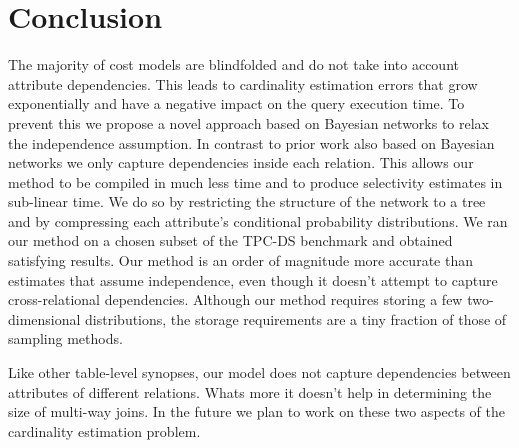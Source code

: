 \documentclass[runningheads]{llncs}
\begin{document}
\section{Conclusion}

The majority of cost models are blindfolded and do not take into account attribute dependencies. This leads to cardinality estimation errors that grow exponentially and have a negative impact on the query execution time. To prevent this we propose a novel approach based on Bayesian networks to relax the independence assumption. In contrast to prior work also based on Bayesian networks we only capture dependencies inside each relation. This allows our method to be compiled in much less time and to produce selectivity estimates in sub-linear time. We do so by restricting the structure of the network to a tree and by compressing each attribute's conditional probability distributions. We ran our method on a chosen subset of the TPC-DS benchmark and obtained satisfying results. Our method is an order of magnitude more accurate than estimates that assume independence, even though it doesn't attempt to capture cross-relational dependencies. Although our method requires storing a few two-dimensional distributions, the storage requirements are a tiny fraction of those of sampling methods.

Like other table-level synopses, our model does not capture dependencies between attributes of different relations. Whats more it doesn't help in determining the size of multi-way joins. In the future we plan to work on these two aspects of the cardinality estimation problem.
%
%
%


%
\end{document}
